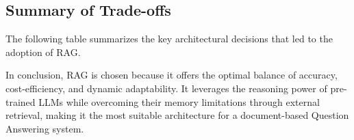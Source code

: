 \subsection{Summary of Trade-offs}

The following table summarizes the key architectural decisions that led to the adoption of RAG.

\begin{table}[h]
\centering
\caption[RAG vs Alternatives]{Comparison of RAG against alternative LLM enhancement strategies.}
\label{tab:rag_comparison}
\end{table}

In conclusion, RAG is chosen because it offers the optimal balance of accuracy, cost-efficiency, and dynamic adaptability. It leverages the reasoning power of pre-trained LLMs while overcoming their memory limitations through external retrieval, making it the most suitable architecture for a document-based Question Answering system.




